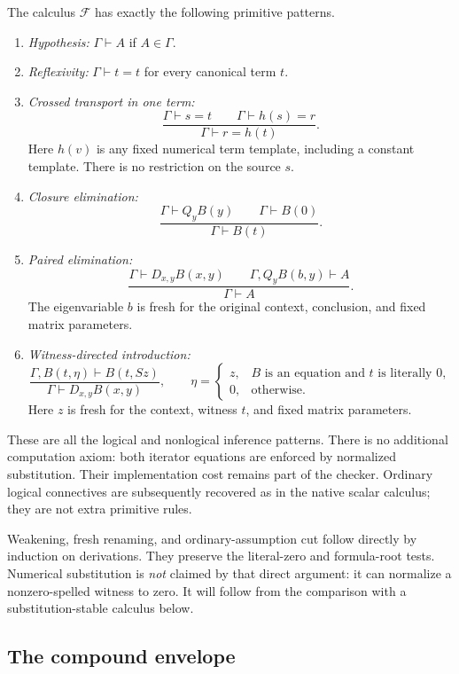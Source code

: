 \documentclass[11pt,letterpaper]{article}
\theoremstyle{definition}
\theoremstyle{remark}
\begin{document}
The calculus $\mathcal F$ has exactly the following primitive patterns.
\begin{enumerate}
\item \emph{Hypothesis:} $\Gamma\vdash A$ if $A\in\Gamma$.
\item \emph{Reflexivity:} $\Gamma\vdash t=t$ for every canonical term $t$.
\item \emph{Crossed transport in one term:}
\[
 \frac{\Gamma\vdash s=t\qquad\Gamma\vdash h(s)=r}
      {\Gamma\vdash r=h(t)}.
 \tag{Tr}\label{env:tr}
\]
Here $h(v)$ is any fixed numerical term template, including a constant
template. There is no restriction on the source $s$.
\item \emph{Closure elimination:}
\[
 \frac{\Gamma\vdash Q_yB(y)\qquad\Gamma\vdash B(0)}
      {\Gamma\vdash B(t)}.
 \tag{QE}\label{env:qe}
\]
\item \emph{Paired elimination:}
\[
 \frac{\Gamma\vdash D_{x,y}B(x,y)\qquad
       \Gamma,Q_yB(b,y)\vdash A}{\Gamma\vdash A}.
 \tag{DE}\label{env:de}
\]
The eigenvariable $b$ is fresh for the original context, conclusion, and
fixed matrix parameters.
\item \emph{Witness-directed introduction:}
\[
 \frac{\Gamma,B(t,\eta)\vdash B(t,Sz)}
      {\Gamma\vdash D_{x,y}B(x,y)},\qquad
 \eta=\begin{cases}
 z,&B\text{ is an equation and }t\text{ is literally }0,\\
 0,&\text{otherwise}.
 \end{cases}
 \tag{WI}\label{env:wi}
\]
Here $z$ is fresh for the context, witness $t$, and fixed matrix parameters.
\end{enumerate}
These are all the logical and nonlogical inference patterns. There is no
additional computation axiom: both iterator equations are enforced by
normalized substitution. Their implementation cost remains part of the
checker. Ordinary logical connectives are subsequently recovered as in the
native scalar calculus; they are not extra primitive rules.

Weakening, fresh renaming, and ordinary-assumption cut follow directly by
induction on derivations. They preserve the literal-zero and formula-root
tests. Numerical substitution is \emph{not} claimed by that direct argument:
it can normalize a nonzero-spelled witness to zero. It will follow from the
comparison with a substitution-stable calculus below.

\subsection{The compound envelope}
\end{document}
